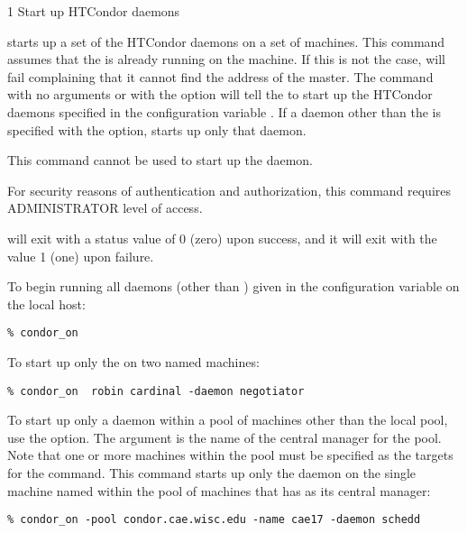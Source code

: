 \begin{ManPage}{\label{man-condor-on}}{1}
{Start up HTCondor daemons}
\Synopsis {}
\ToolArgsBase

\ToolDebugOption
\ToolWhere \ToolArgsAffect


\Description 

 starts up a set of the HTCondor daemons on a set of
machines.
This command assumes that the  is already
running on the machine.
If this is not the case,  will
fail complaining that it cannot find the address of the master.
The command  with no arguments or with
 the  option will
tell the  to start up the HTCondor daemons specified
in the configuration variable .
If a daemon other than the  is specified
with the  option,
 starts up only that daemon.

This command cannot be used to start up the  daemon.

For security reasons of authentication and authorization,
this command requires ADMINISTRATOR level of access.

\begin{Options}
    \ToolArgsBaseDesc
    \ToolDebugDesc
    \ToolArgsLocateDesc
    \ToolArgsAffectDesc
\end{Options}

\ExitStatus

 will exit with a status value of 0 (zero) upon success,
and it will exit with the value 1 (one) upon failure.

\Examples
To begin running all daemons (other than ) given
in the configuration variable 
on the local host:
\begin{verbatim}
% condor_on
\end{verbatim}

To start up only the  on two named machines:
\begin{verbatim}
% condor_on  robin cardinal -daemon negotiator
\end{verbatim}

To start up only a daemon within a pool of machines
other than the local pool, use the  option.
The argument is the name of the central manager for the pool.
Note that one or more machines within the pool must be
specified as the targets for the command.
This command starts up only the  daemon
on the single machine named  within the
pool of machines that has  as
its central manager:
\begin{verbatim}
% condor_on -pool condor.cae.wisc.edu -name cae17 -daemon schedd
\end{verbatim}

\end{ManPage}
